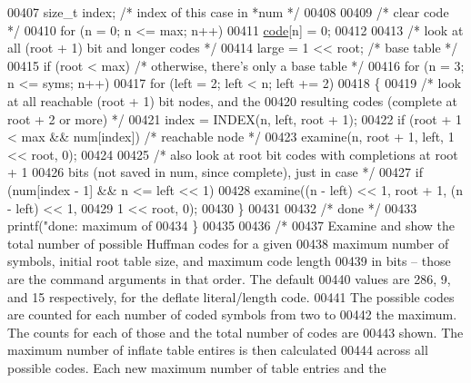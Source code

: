 \begin{DoxyCode}
{{00407     \textcolor{keywordtype}{size\_t} index;       \textcolor{comment}{/* index of this case in *num */}
00408 
00409     \textcolor{comment}{/* clear code */}
00410     \textcolor{keywordflow}{for} (n = 0; n <= max; n++)
00411         \hyperlink{structcode}{code}[n] = 0;
00412 
00413     \textcolor{comment}{/* look at all (root + 1) bit and longer codes */}
00414     large = 1 << root;              \textcolor{comment}{/* base table */}
00415     \textcolor{keywordflow}{if} (root < max)                 \textcolor{comment}{/* otherwise, there's only a base table */}
00416         \textcolor{keywordflow}{for} (n = 3; n <= syms; n++)
00417             \textcolor{keywordflow}{for} (left = 2; left < n; left += 2)
00418             \{
00419                 \textcolor{comment}{/* look at all reachable (root + 1) bit nodes, and the}
00420 \textcolor{comment}{                   resulting codes (complete at root + 2 or more) */}
00421                 index = INDEX(n, left, root + 1);
00422                 \textcolor{keywordflow}{if} (root + 1 < max && num[index])       \textcolor{comment}{/* reachable node */}
00423                     examine(n, root + 1, left, 1 << root, 0);
00424 
00425                 \textcolor{comment}{/* also look at root bit codes with completions at root + 1}
00426 \textcolor{comment}{                   bits (not saved in num, since complete), just in case */}
00427                 \textcolor{keywordflow}{if} (num[index - 1] && n <= left << 1)
00428                     examine((n - left) << 1, root + 1, (n - left) << 1,
00429                             1 << root, 0);
00430             \}
00431 
00432     \textcolor{comment}{/* done */}
00433     printf(\textcolor{stringliteral}{"done: maximum of %
00434 \}
00435 
00436 \textcolor{comment}{/*}
00437 \textcolor{comment}{   Examine and show the total number of possible Huffman codes for a given}
00438 \textcolor{comment}{   maximum number of symbols, initial root table size, and maximum code length}
00439 \textcolor{comment}{   in bits -- those are the command arguments in that order.  The default}
00440 \textcolor{comment}{   values are 286, 9, and 15 respectively, for the deflate literal/length code.}
00441 \textcolor{comment}{   The possible codes are counted for each number of coded symbols from two to}
00442 \textcolor{comment}{   the maximum.  The counts for each of those and the total number of codes are}
00443 \textcolor{comment}{   shown.  The maximum number of inflate table entires is then calculated}
00444 \textcolor{comment}{   across all possible codes.  Each new maximum number of table entries and the}
}}}
\end{DoxyCode}
